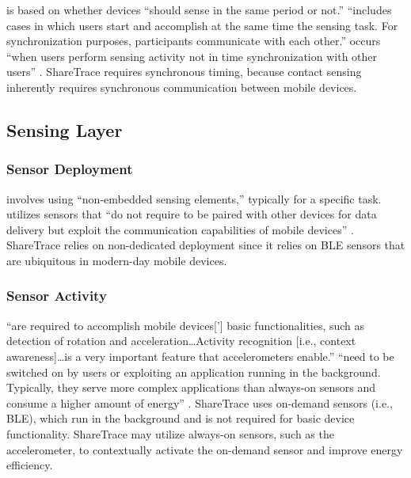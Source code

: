  is based on whether devices ``should sense in the same period or not.''  ``includes cases in which users start and accomplish at the same time the sensing task. For synchronization purposes, participants communicate with each other.''  occurs ``when users perform sensing activity not in time synchronization with other users'' \citep{Capponi2019}. ShareTrace requires synchronous timing, because contact sensing inherently requires synchronous communication between mobile devices.

\subsection{Sensing Layer}

\subsubsection{Sensor Deployment}

 involves using ``non-embedded sensing elements,'' typically for a specific task.  utilizes sensors that ``do not require to be paired with other devices for data delivery but exploit the communication capabilities of mobile devices'' \citep{Capponi2019}. ShareTrace relies on non-dedicated deployment since it relies on BLE sensors that are ubiquitous in modern-day mobile devices.

\subsubsection{Sensor Activity}

 ``are required to accomplish mobile devices['] basic functionalities, such as detection of rotation and acceleration{\ldots}Activity recognition [i.e., context awareness]{\ldots}is a very important feature that accelerometers enable.''  ``need to be switched on by users or exploiting an application running in the background. Typically, they serve more complex applications than always-on sensors and consume a higher amount of energy'' \citep{Capponi2019}. ShareTrace uses on-demand sensors (i.e., BLE), which run in the background and is not required for basic device functionality. ShareTrace may utilize always-on sensors, such as the accelerometer, to contextually activate the on-demand sensor and improve energy efficiency.

